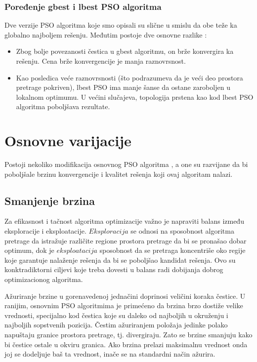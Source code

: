 \documentclass[a4paper]{article}
\begin{document}
\subsubsection{Poređenje gbest i lbest PSO algoritma}
Dve verzije PSO algoritma koje smo opisali su slične u smislu da obe teže ka globalno najboljem rešenju. Međutim postoje dve osnovne razlike \cite{engelbrecht2007computational}:
\begin{itemize}
    \item Zbog bolje povezanosti čestica u gbest algoritmu, on brže konvergira ka rešenju. Cena brže konvergencije je manja raznovrsnost.
    \item Kao posledica veće raznovrsnosti (što podrazumeva da je veći deo prostora pretrage pokriven), lbest PSO ima manje šanse da ostane zaroboljen u lokalnom optimumu. U većini slučajeva, topologija prstena kao kod lbest PSO algoritma poboljšava rezultate.
\end{itemize}

\section{Osnovne varijacije}
Postoji nekoliko modifikacija osnovnog PSO algoritma \cite{rini2011particle}, a one su razvijane da bi poboljšale brzinu konvergencije i kvalitet rešenja koji ovaj algoritam nalazi.

\subsection{Smanjenje brzina}
Za efikasnost i tačnost algoritma optimizacije važno je napraviti balans između eksploracije i eksploatacije. 
$Eksploracija$ se odnosi na sposobnost algoritma pretrage da istražuje različite regione prostora pretrage da bi se pronašao dobar optimum, dok je $eksploatacija$ sposobnost  da se pretraga koncentriše oko regije koje garantuje nalaženje rešenja da bi se poboljšao kandidat rešenja. Ovo su konktradiktorni ciljevi koje treba dovesti u balans radi dobijanja dobrog optimizacionog algoritma.

Ažuriranje brzine u gorenavedenoj jednačini doprinosi veličini koraka čestice. U ranijim, osnovnim PSO algoritmima je primećeno da brzina brzo dostiže velike vrednosti, specijalno kod čestica koje su daleko od najboljih u okruženju i najboljih sopstvenih pozicija. Čestim ažuriranjem položaja jedinke polako napuštaju granice prostora pretrage, tj. divergiraju. Zato se brzine smanjuju kako bi čestice ostale u okviru granica. Ako brzina prelazi maksimalnu vrednost onda joj se dodeljuje baš ta vrednost, inače se na standardni način ažurira.
\end{document}
